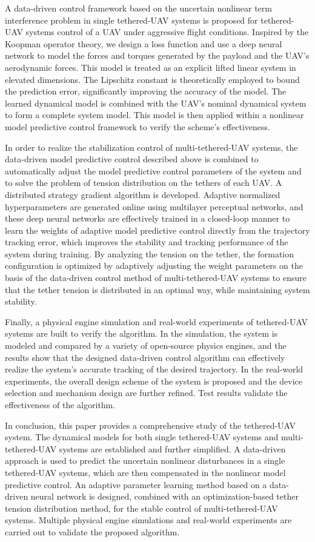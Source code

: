 \documentclass[lang=chs, degree=master, blindreview=true, winfonts=true]{yanputhesis}
\begin{document}
\begin{engabstract}
	A data-driven control framework based on the uncertain nonlinear term interference problem in single tethered-UAV systems is proposed for tethered-UAV systems control of a UAV under aggressive flight conditions. Inspired by the Koopman operator theory, we design a loss function and use a deep neural network to model the forces and torques generated by the payload and the UAV's aerodynamic forces. This model is treated as an explicit lifted linear system in elevated dimensions. The Lipschitz constant is theoretically employed to bound the prediction error, significantly improving the accuracy of the model. The learned dynamical model is combined with the UAV's nominal dynamical system to form a complete system model. This model is then applied within a nonlinear model predictive control framework to verify the scheme's effectiveness.
	
	In order to realize the stabilization control of multi-tethered-UAV systems, the data-driven model predictive control described above is combined to automatically adjust the model predictive control parameters of the system and to solve the problem of tension distribution on the tethers of each UAV. A distributed strategy gradient algorithm is developed. Adaptive normalized hyperparameters are generated online using multilayer perceptual networks, and these deep neural networks are effectively trained in a closed-loop manner to learn the weights of adaptive model predictive control directly from the trajectory tracking error, which improves the stability and tracking performance of the system during training. By analyzing the tension on the tether, the formation configuration is optimized by adaptively adjusting the weight parameters on the basis of the data-driven control method of multi-tethered-UAV systems to ensure that the tether tension is distributed in an optimal way, while maintaining system stability.
	
	
	Finally, a physical engine simulation and real-world experiments of tethered-UAV systems are built to verify the algorithm. In the simulation, the system is modeled and compared by a variety of open-source physics engines, and the results show that the designed data-driven control algorithm can effectively realize the system's accurate tracking of the desired trajectory. In the real-world experiments, the overall design scheme of the system is proposed and the device selection and mechanism design are further refined. Test results validate the effectiveness of the algorithm.
	
	In conclusion, this paper provides a comprehensive study of the tethered-UAV system. The dynamical models for both single tethered-UAV systems and multi-tethered-UAV systems are established and further simplified. A data-driven approach is used to predict the uncertain nonlinear disturbances in a single tethered-UAV systems, which are then compensated in the nonlinear model predictive control. An adaptive parameter learning method based on a data-driven neural network is designed, combined with an optimization-based tether tension distribution method, for the stable control of multi-tethered-UAV systems. Multiple physical engine simulations and real-world experiments are carried out to validate the proposed algorithm.
	

\end{engabstract}
\end{document}
